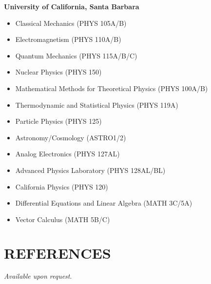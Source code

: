 \documentclass[margin, 10pt]{style/res} %
\begin{document}
\begin{resume}
\textbf{University of California, Santa Barbara}\\[-2.3ex]
\begin{itemize}[leftmargin=4ex] \itemsep -2pt
\item Classical Mechanics ({\footnotesize{PHYS 105A/B}}) 
\item Electromagnetism ({\footnotesize{PHYS 110A/B}}) 
\item Quantum Mechanics ({\footnotesize{PHYS 115A/B/C}}) 
\item Nuclear Physics ({\footnotesize{PHYS 150}}) 
\item Mathematical Methods for Theoretical Physics ({\footnotesize{PHYS 100A/B}}) 
\item Thermodynamic and Statistical Physics ({\footnotesize{PHYS 119A}}) 
\item Particle Physics ({\footnotesize{PHYS 125}}) 
\item Astronomy/Cosmology ({\footnotesize{ASTRO1/2}})
\item Analog Electronics ({\footnotesize{PHYS 127AL}}) 
\item Advanced Physics Laboratory ({\footnotesize{PHYS 128AL/BL}}) 
\item California Physics ({\footnotesize{PHYS 120}})
\item Differential Equations and Linear Algebra ({\footnotesize{MATH 3C/5A}}) 
\item Vector Calculus ({\footnotesize{MATH 5B/C}}) 
\end{itemize}





\section{\small{REFERENCES}}

{\sl Available upon request}.


\end{resume}
\end{document}
